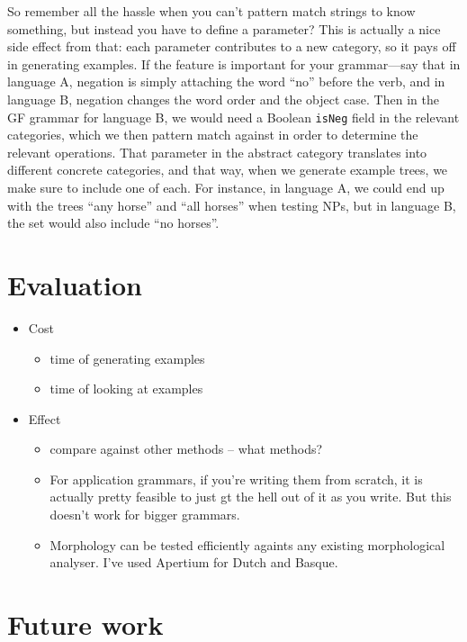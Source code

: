 \documentclass[11pt]{article}
\begin{document}
{So remember all the hassle when you can't pattern match strings to
know something, but instead you have to define a parameter? This is
actually a nice side effect from that: each parameter contributes to a
new category, so it pays off in generating examples. If the feature is
important for your grammar---say that in language A, negation is
simply attaching the word  ``no'' before the verb, and in language B,
negation changes the word order and the object case. Then in the GF
grammar for language B, we would need a Boolean \texttt{isNeg} field
in the relevant categories, which we then pattern match against in
order to determine the relevant operations. That parameter in the
abstract category translates into different concrete categories, and
that way, when we generate example trees, we make sure to include one
of each. For instance, in language A, we could end up with the trees
``any horse'' and ``all horses'' when testing NPs, but in language B,
the set would also include ``no horses''. 



\section{Evaluation}


\begin{itemize}
\item Cost
  \begin{itemize}
  \item time of generating examples
  \item time of looking at examples
  \end{itemize}

\item Effect
  \begin{itemize}
  \item compare against other methods -- what methods?
  \item For application grammars, if you're writing them from scratch, it is actually pretty feasible to just gt the hell out of it as you write. But this doesn't work for bigger grammars.
  \item Morphology can be tested efficiently againts any existing morphological analyser. I've used Apertium for Dutch and Basque.
  \end{itemize}
\end{itemize}


\section{Future work}


}
\end{document}

